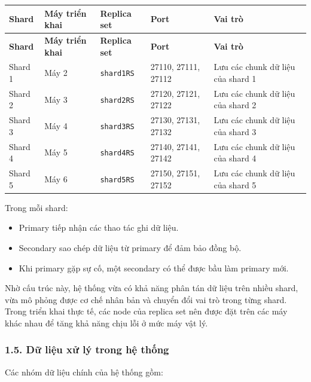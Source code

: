 \documentclass[12pt,a4paper]{article}
\begin{document}
\begin{center}
\small
\begin{longtable}{|p{1.6cm}|p{1.8cm}|p{2.3cm}|p{3cm}|p{5cm}|}
\hline
\textbf{Shard} & \textbf{Máy triển khai} & \textbf{Replica set} & \textbf{Port} & \textbf{Vai trò} \\ \hline
\endfirsthead
\hline
\textbf{Shard} & \textbf{Máy triển khai} & \textbf{Replica set} & \textbf{Port} & \textbf{Vai trò} \\ \hline
\endhead
Shard 1 & Máy 2 & \texttt{shard1RS} & 27110, 27111, 27112 & Lưu các chunk dữ liệu của shard 1 \\ \hline
Shard 2 & Máy 3 & \texttt{shard2RS} & 27120, 27121, 27122 & Lưu các chunk dữ liệu của shard 2 \\ \hline
Shard 3 & Máy 4 & \texttt{shard3RS} & 27130, 27131, 27132 & Lưu các chunk dữ liệu của shard 3 \\ \hline
Shard 4 & Máy 5 & \texttt{shard4RS} & 27140, 27141, 27142 & Lưu các chunk dữ liệu của shard 4 \\ \hline
Shard 5 & Máy 6 & \texttt{shard5RS} & 27150, 27151, 27152 & Lưu các chunk dữ liệu của shard 5 \\ \hline
\end{longtable}
\normalsize
\end{center}

Trong mỗi shard:

\begin{itemize}
    \item Primary tiếp nhận các thao tác ghi dữ liệu.
    \item Secondary sao chép dữ liệu từ primary để đảm bảo đồng bộ.
    \item Khi primary gặp sự cố, một secondary có thể được bầu làm primary mới.
\end{itemize}

Nhờ cấu trúc này, hệ thống vừa có khả năng phân tán dữ liệu trên nhiều shard, vừa mô phỏng được cơ chế nhân bản và chuyển đổi vai trò trong từng shard. Trong triển khai thực tế, các node của replica set nên được đặt trên các máy khác nhau để tăng khả năng chịu lỗi ở mức máy vật lý.

\subsubsection*{1.5. Dữ liệu xử lý trong hệ thống}

Các nhóm dữ liệu chính của hệ thống gồm:
\end{document}
